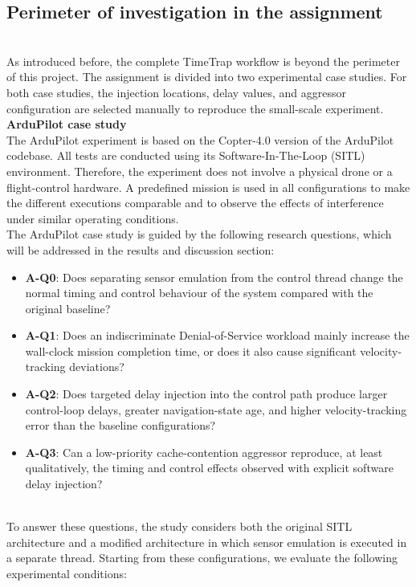 \subsection{Perimeter of investigation in the assignment}
\\
As introduced before, the complete TimeTrap workflow is beyond the perimeter of this project. The assignment is divided into two experimental case studies. For both case studies, the injection locations, delay values, and aggressor configuration are selected manually to reproduce the small-scale experiment.
\\
\textbf{ArduPilot case study} \\
The ArduPilot experiment is based on the Copter-4.0 version of the ArduPilot codebase. All tests are conducted using its Software-In-The-Loop (SITL) environment. Therefore, the experiment does not involve a physical drone or a flight-control hardware. A predefined mission is used in all configurations to make the different executions comparable and to observe the effects of interference under similar operating conditions.
\\
The ArduPilot case study is guided by the following research questions, which will be addressed in the results and discussion section:
\begin{itemize}[nosep]
    \item \textbf{A-Q0}: Does separating sensor emulation from the control thread change the normal timing and control behaviour of the system compared with the original baseline?     
    \item \textbf{A-Q1}: Does an indiscriminate Denial-of-Service workload mainly increase the wall-clock mission completion time, or does it also cause significant velocity-tracking deviations?
    \item \textbf{A-Q2}: Does targeted delay injection into the control path produce larger control-loop delays, greater navigation-state age, and higher velocity-tracking error than the baseline configurations?
    \item \textbf{A-Q3}: Can a low-priority cache-contention aggressor reproduce, at least qualitatively, the timing and control effects observed with explicit software delay injection?
\end{itemize}
\\ %
To answer these questions, the study considers both the original SITL architecture and a modified architecture in which sensor emulation is executed in a separate thread. Starting from these configurations, we evaluate the following experimental conditions:
